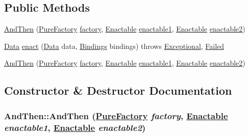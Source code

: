 \subsection*{Public Methods}
\begin{CompactItemize}
\item 
\hyperlink{classAndThen_a0}{And\-Then} (\hyperlink{classPureFactory}{Pure\-Factory} \hyperlink{classDataImpl_o0}{factory}, \hyperlink{interfaceEnactable}{Enactable} \hyperlink{classAbstractInfixCombinator_o0}{enactable1}, \hyperlink{interfaceEnactable}{Enactable} \hyperlink{classAbstractInfixCombinator_o1}{enactable2})
\item 
\hyperlink{interfaceData}{Data} \hyperlink{classAndThen_a1}{enact} (\hyperlink{interfaceData}{Data} data, \hyperlink{interfaceBindings}{Bindings} bindings) throws \hyperlink{classExceptional}{Exceptional}, \hyperlink{classFailed}{Failed}
\item 
\hyperlink{classAndThen_a2}{And\-Then} (\hyperlink{classPureFactory}{Pure\-Factory} \hyperlink{classDataImpl_o0}{factory}, \hyperlink{interfaceEnactable}{Enactable} \hyperlink{classAbstractInfixCombinator_o0}{enactable1}, \hyperlink{interfaceEnactable}{Enactable} \hyperlink{classAbstractInfixCombinator_o1}{enactable2})
\end{CompactItemize}


\subsection{Constructor \& Destructor Documentation}
\hypertarget{classAndThen_a0}{
\subsubsection[AndThen]{\setlength{\rightskip}{0pt plus 5cm}And\-Then::And\-Then (\hyperlink{classPureFactory}{Pure\-Factory} {\em factory}, \hyperlink{interfaceEnactable}{Enactable} {\em enactable1}, \hyperlink{interfaceEnactable}{Enactable} {\em enactable2})}}
\label{classAndThen_a0}




